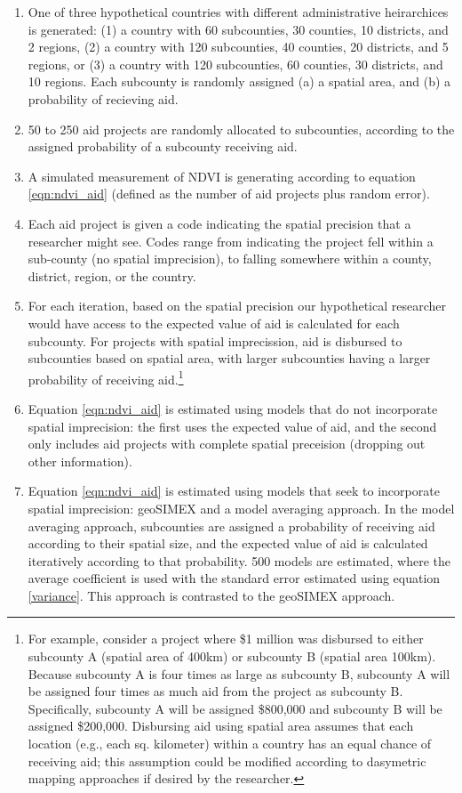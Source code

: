 \begin{enumerate}
\item One of three hypothetical countries with different administrative heirarchices is generated: (1) a country with 60 subcounties, 30 counties, 10 districts, and 2 regions, (2) a country with 120 subcounties, 40 counties, 20 districts, and 5 regions, or (3) a country with 120 subcounties, 60 counties, 30 districts, and 10 regions. Each subcounty is randomly assigned (a) a spatial area, and (b) a probability of recieving aid. 
\item 50 to 250 aid projects are randomly allocated to subcounties, according to the assigned probability of a subcounty receiving aid. 
\item A simulated measurement of NDVI is generating according to equation \ref{eqn:ndvi_aid} (defined as the number of aid projects plus random error).
\item Each aid project is given a code indicating the spatial precision that a researcher might see. Codes range from indicating the project fell within a sub-county (no spatial imprecision), to falling somewhere within a county, district, region, or the country. 
\item For each iteration, based on the spatial precision our hypothetical researcher would have access to the expected value of aid is calculated for each subcounty. For projects with spatial imprecission, aid is disbursed to subcounties based on spatial area, with larger subcounties having a larger probability of receiving aid.\footnote{For example, consider a project where \$1 million was disbursed to either subcounty A (spatial area of 400km) or subcounty B (spatial area 100km). Because subcounty A is four times as large as subcounty B, subcounty A will be assigned four times as much aid from the project as subcounty B. Specifically, subcounty A will be assigned \$800,000 and subcounty B will be assigned \$200,000. Disbursing aid using spatial area assumes that each location (e.g., each sq. kilometer) within a country has an equal chance of receiving aid; this assumption could be modified according to dasymetric mapping approaches if desired by the researcher.}
\item Equation \ref{eqn:ndvi_aid} is estimated using  models that do not incorporate spatial imprecision: the first uses the expected value of aid, and the second only includes aid projects with complete spatial preceision (dropping out other information).
\item Equation \ref{eqn:ndvi_aid} is estimated using models that seek to incorporate spatial imprecision: geoSIMEX and a model averaging approach. In the model averaging approach, subcounties are assigned a probability of receiving aid according to their spatial size, and the expected value of aid is calculated iteratively according to that probability.  500 models are estimated, where the average coefficient is used with the standard error estimated using equation \ref{variance}. This approach is contrasted to the geoSIMEX approach.
\end{enumerate}

